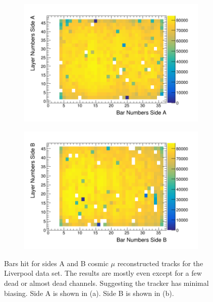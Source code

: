 \begin{figure}[!h]
\centering
\begin{subfigure}{.5\textwidth}
  \centering
  \includegraphics[width=\linewidth]{Chapter5/Figs/wylfaRasterNew/liverpoolSideAHits.png}
  \captionsetup{width=.9\linewidth}
  \caption{}
  \label{subFig:liverpoolSideAHits}
\end{subfigure}%
\begin{subfigure}{.5\textwidth}
  \centering
\includegraphics[width=\linewidth]{Chapter5/Figs/wylfaRasterNew/liverpoolSideBHits.png}
  \captionsetup{width=.9\linewidth}
  \caption{}
  \label{subFig:liverpoolSideBHits}
\end{subfigure}
\caption{Bars hit for sides A and B cosmic $\mu$ reconstructed tracks for the Liverpool data set. The results are mostly even except for a few dead or almost dead channels. Suggesting the tracker has minimal biasing. Side A is shown in (a). Side B is shown in (b).}
\label{fig:liverpoolSideABHits}
\end{figure}

